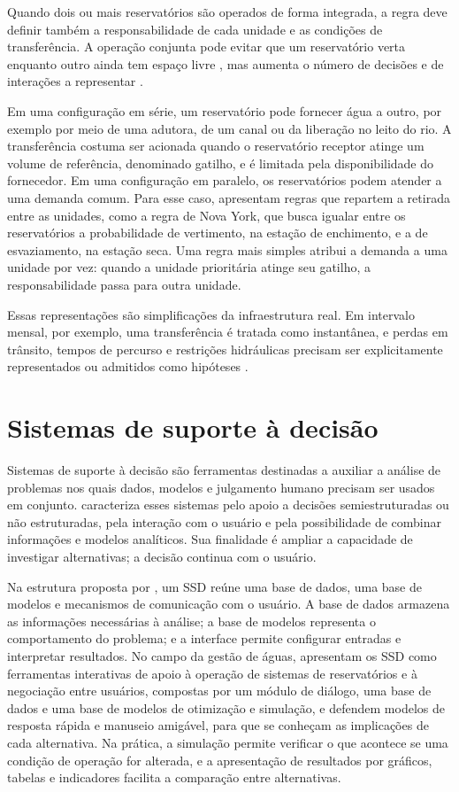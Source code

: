 Quando dois ou mais reservatórios são operados de forma integrada, a regra deve definir também a responsabilidade de cada unidade e as condições de transferência. A operação conjunta pode evitar que um reservatório verta enquanto outro ainda tem espaço livre \cite{lundGuzman1999}, mas aumenta o número de decisões e de interações a representar \cite{labadie2004}.

Em uma configuração em série, um reservatório pode fornecer água a outro, por exemplo por meio de uma adutora, de um canal ou da liberação no leito do rio. A transferência costuma ser acionada quando o reservatório receptor atinge um volume de referência, denominado gatilho, e é limitada pela disponibilidade do fornecedor. Em uma configuração em paralelo, os reservatórios podem atender a uma demanda comum. Para esse caso,  apresentam regras que repartem a retirada entre as unidades, como a regra de Nova York, que busca igualar entre os reservatórios a probabilidade de vertimento, na estação de enchimento, e a de esvaziamento, na estação seca. Uma regra mais simples atribui a demanda a uma unidade por vez: quando a unidade prioritária atinge seu gatilho, a responsabilidade passa para outra unidade.

Essas representações são simplificações da infraestrutura real. Em intervalo mensal, por exemplo, uma transferência é tratada como instantânea, e perdas em trânsito, tempos de percurso e restrições hidráulicas precisam ser explicitamente representados ou admitidos como hipóteses \cite{loucksVanBeek2017}.

\section{Sistemas de suporte à decisão}
\label{sec:ssd}

Sistemas de suporte à decisão são ferramentas destinadas a auxiliar a análise de problemas nos quais dados, modelos e julgamento humano precisam ser usados em conjunto.  caracteriza esses sistemas pelo apoio a decisões semiestruturadas ou não estruturadas, pela interação com o usuário e pela possibilidade de combinar informações e modelos analíticos. Sua finalidade é ampliar a capacidade de investigar alternativas; a decisão continua com o usuário.

Na estrutura proposta por , um SSD reúne uma base de dados, uma base de modelos e mecanismos de comunicação com o usuário. A base de dados armazena as informações necessárias à análise; a base de modelos representa o comportamento do problema; e a interface permite configurar entradas e interpretar resultados. No campo da gestão de águas,  apresentam os SSD como ferramentas interativas de apoio à operação de sistemas de reservatórios e à negociação entre usuários, compostas por um módulo de diálogo, uma base de dados e uma base de modelos de otimização e simulação, e defendem modelos de resposta rápida e manuseio amigável, para que se conheçam as implicações de cada alternativa. Na prática, a simulação permite verificar o que acontece se uma condição de operação for alterada, e a apresentação de resultados por gráficos, tabelas e indicadores facilita a comparação entre alternativas.

